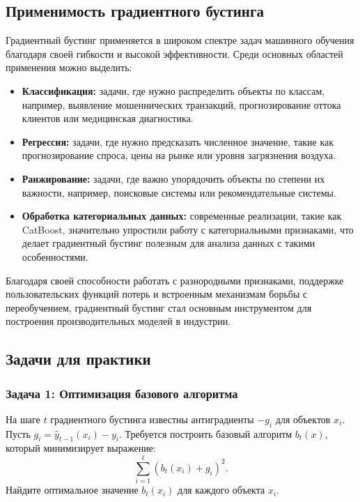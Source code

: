 \subsection{Применимость градиентного бустинга}

Градиентный бустинг применяется в широком спектре задач машинного обучения благодаря своей гибкости и высокой эффективности. Среди основных областей применения можно выделить:

\begin{itemize}
    \item \textbf{Классификация:} задачи, где нужно распределить объекты по классам, например, выявление мошеннических транзакций, прогнозирование оттока клиентов или медицинская диагностика.
    \item \textbf{Регрессия:} задачи, где нужно предсказать численное значение, такие как прогнозирование спроса, цены на рынке или уровня загрязнения воздуха.
    \item \textbf{Ранжирование:} задачи, где важно упорядочить объекты по степени их важности, например, поисковые системы или рекомендательные системы.
    \item \textbf{Обработка категориальных данных:} современные реализации, такие как CatBoost, значительно упростили работу с категориальными признаками, что делает градиентный бустинг полезным для анализа данных с такими особенностями.
\end{itemize}

Благодаря своей способности работать с разнородными признаками, поддержке пользовательских функций потерь и встроенным механизмам борьбы с переобучением, градиентный бустинг стал основным инструментом для построения производительных моделей в индустрии.

\subsection{Задачи для практики}

\subsubsection{Задача 1: Оптимизация базового алгоритма}

На шаге $t$ градиентного бустинга известны антиградиенты $-g_i$ для объектов $x_i$. Пусть $g_i = \hat{y}_{t-1}(x_i) - y_i$.
Требуется построить базовый алгоритм $b_t(x)$, который минимизирует выражение:
\[
    \sum_{i=1}^\ell (b_t(x_i) + g_i)^2.
\]
Найдите оптимальное значение $b_t(x_i)$ для каждого объекта $x_i$.

